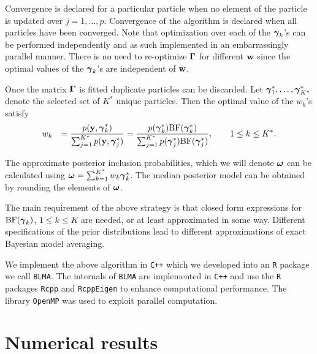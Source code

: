 \noindent 
Convergence is declared for a particular particle when no element of the particle
is updated over $j=1,\ldots,p$. Convergence of the algorithm is declared when all particles
have been converged. Note that optimization over each of the ${\boldsymbol \gamma}_k$'s can be performed
independently and as such implemented in an embarrassingly parallel manner. 
There is no need to re-optimize ${\boldsymbol \Gamma}$ for different ${\bf w}$ since  the optimal
values of the ${\boldsymbol \gamma}_k$'s are independent of ${\bf w}$.

Once the matrix ${\boldsymbol \Gamma}$ is fitted duplicate particles can be discarded.  Let ${{\boldsymbol \gamma}}_1^*,\ldots,{{\boldsymbol \gamma}}_{K^*}^*$
denote the selected set of $K^*$ unique particles. Then
the optimal value of the $w_k$'s satisfy
\begin{equation}
\label{eq:updateW}
\begin{array}{rl}
\displaystyle w_k 
& \displaystyle = \frac{\displaystyle p({\bf y},{\boldsymbol \gamma}_k^*)}{\sum_{j=1}^{K^*} p({\bf y},{\boldsymbol \gamma}_j^*)}
= \frac{p({\boldsymbol \gamma}_k^*)\mbox{BF}({\boldsymbol \gamma}_k^*)
}{\sum_{j=1}^{K^*}
	p({\boldsymbol \gamma}_j^*)\mbox{BF}({\boldsymbol \gamma}_j^*)
}, \qquad 1\le k\le K^*.
\end{array}
\end{equation}

\noindent The approximate posterior inclusion probabilities, which we will denote ${\boldsymbol \omega}$ can be calculated using
${\boldsymbol \omega} = \sum_{k=1}^{K^*} w_k {\boldsymbol \gamma}_k^*$.
The median posterior model can be obtained by rounding the elements of ${\boldsymbol \omega}$.

The main requirement of the above strategy is that closed form expressions for $\mbox{BF}({\boldsymbol \gamma}_k)$,
$1\le k\le K$ are needed, or at least approximated in some way.
Different specifications of the prior distributions lead to different approximations of exact Bayesian
model averaging.

We implement the above algorithm in {\tt C++} which we developed into an {\tt R}
package we call  {\tt BLMA}.
The internals of {\tt BLMA} are implemented
in {\tt C++} and use the {\tt R} packages \texttt{Rcpp} and \texttt{RcppEigen} to enhance
computational performance. The library {\tt OpenMP} was used to
exploit parallel computation.

\section{Numerical results}
\label{sec:numerical}

